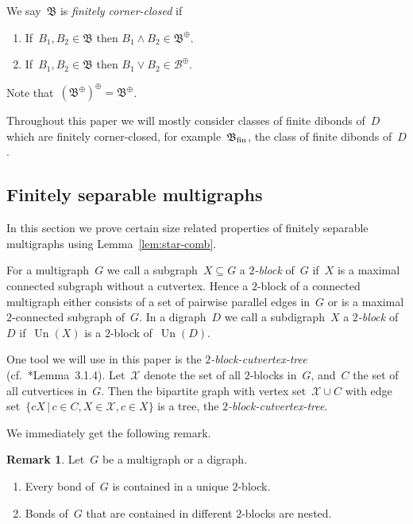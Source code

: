 \documentclass[reqno, 12pt]{amsart}
\numberwithin{equation}{section}
\numberwithin{figure}{section}
\theoremstyle{plain}
\theoremstyle{definition}
\newtheorem{remark}[thm]{Remark}
\DeclareMathOperator{\Un}{Un}
\begin{document}
We say~$\mathfrak{B}$ is \emph{finitely corner-closed} if 
\begin{enumerate}
    \item If~${B_1, B_2 \in \mathfrak{B}}$ then 
    ${B_1 \wedge B_2 \in \mathfrak{B}^\oplus}$.
    \item If~${B_1, B_2 \in \mathfrak{B}}$ then 
    ${B_1 \vee B_2 \in \mathcal{B}^\oplus}$.
\end{enumerate}

Note that~$(\mathfrak{B}^\oplus)^\oplus = \mathfrak{B}^\oplus$.
 
Throughout this paper we will mostly consider classes of finite dibonds of~$D$ which are finitely corner-closed, for example~$\mathfrak{B}_\textnormal{fin}$, the class of finite dibonds of~$D$. 


\subsection{Finitely separable multigraphs}

In this section we prove certain size related properties of finitely separable multigraphs using Lemma~\ref{lem:star-comb}.


For a multigraph~$G$ we call a subgraph~${X \subseteq G}$ a \emph{$2$-block} of~$G$ if~$X$ is a maximal connected subgraph without a cutvertex. 
Hence a $2$-block of a connected multigraph either consists of a set of pairwise parallel edges in~$G$ or is a maximal $2$-connected subgraph of~$G$. 
In a digraph~$D$ we call a subdigraph~$X$ a \emph{$2$-block} of~$D$ if~$\Un(X)$ is a $2$-block of~$\Un(D)$.

One tool we will use in this paper is the \emph{$2$-block-cutvertex-tree} (cf.~\cite{diestel_buch}*{Lemma~3.1.4}). 
Let~$\mathcal{X}$ denote the set of all $2$-blocks in~$G$, and~$C$ the set of all cutvertices in~$G$. 
Then the bipartite graph with vertex set~${\mathcal{X} \cup C}$ with edge set~${\{ c X \, | \, c \in C, X \in \mathcal{X}, c \in X \}}$ is a tree, the \emph{$2$-block-cutvertex-tree}. 

We immediately get the following remark.

\begin{remark}
    \label{rem:bonds-in-blocks}
    Let~$G$ be a multigraph or a digraph.
    \begin{enumerate}
        [label=(\roman*)]
        \item \label{item:bonds-in-blocks1}
            Every bond of~$G$ is contained in a unique $2$-block.
        \item \label{item:bonds-in-blocks2}
            Bonds of~$G$ that are contained in different $2$-blocks are nested. 
    \end{enumerate}
\end{remark}
\end{document}

